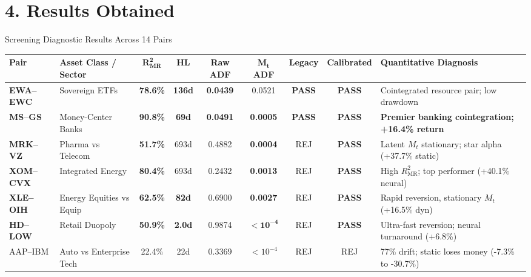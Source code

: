 \documentclass[10pt, aspectratio=169]{beamer}
\begin{document}
\section{4. Results Obtained}

\begin{frame}{Screening Diagnostic Results Across 14 Pairs}
  \scriptsize
  \setlength{\tabcolsep}{3pt}
  \begin{table}
    \centering
    \begin{tabular}{@{}llccccccl@{}}
      \toprule
      \textbf{Pair} & \textbf{Asset Class / Sector} & $\bm{R^2_{\text{MR}}}$ & $\bm{HL}$ & \textbf{Raw ADF} & $\bm{M_t}$ \textbf{ADF} & \textbf{Legacy} & \textbf{Calibrated} & \textbf{Quantitative Diagnosis} \\
      \midrule
      \textbf{EWA--EWC} & Sovereign ETFs & \textbf{78.6\%} & \textbf{136d} & \textbf{0.0439} & 0.0521 & \textcolor{posgreen}{\textbf{PASS}} & \textcolor{posgreen}{\textbf{PASS}} & Cointegrated resource pair; low drawdown \\
      \textbf{MS--GS} & Money-Center Banks & \textbf{90.8\%} & \textbf{69d} & \textbf{0.0491} & \textbf{0.0005} & \textcolor{posgreen}{\textbf{PASS}} & \textcolor{posgreen}{\textbf{PASS}} & \textbf{Premier banking cointegration; +16.4\% return} \\
      \textbf{MRK--VZ} & Pharma vs Telecom & \textbf{51.7\%} & 693d & 0.4882 & \textbf{0.0004} & \textcolor{negred}{REJ} & \textcolor{posgreen}{\textbf{PASS}} & Latent $M_t$ stationary; star alpha (+37.7\% static) \\
      \textbf{XOM--CVX} & Integrated Energy & \textbf{80.4\%} & 693d & 0.2432 & \textbf{0.0013} & \textcolor{negred}{REJ} & \textcolor{posgreen}{\textbf{PASS}} & High $R^2_{\text{MR}}$; top performer (+40.1\% neural) \\
      \textbf{XLE--OIH} & Energy Equities vs Equip & \textbf{62.5\%} & \textbf{82d} & 0.6900 & \textbf{0.0027} & \textcolor{negred}{REJ} & \textcolor{posgreen}{\textbf{PASS}} & Rapid reversion, stationary $M_t$ (+16.5\% dyn) \\
      \textbf{HD--LOW} & Retail Duopoly & \textbf{50.9\%} & \textbf{2.0d} & 0.9874 & $\mathbf{<10^{-4}}$ & \textcolor{negred}{REJ} & \textcolor{posgreen}{\textbf{PASS}} & Ultra-fast reversion; neural turnaround (+6.8\%) \\
      \midrule
      AAP--IBM & Auto vs Enterprise Tech & 22.4\% & 22d & 0.3369 & $<10^{-4}$ & \textcolor{negred}{REJ} & \textcolor{negred}{REJ} & 77\% drift; static loses money (-7.3\% to -30.7\%) \\

\end{tabular}
\end{table}
\end{frame}
\end{document}
